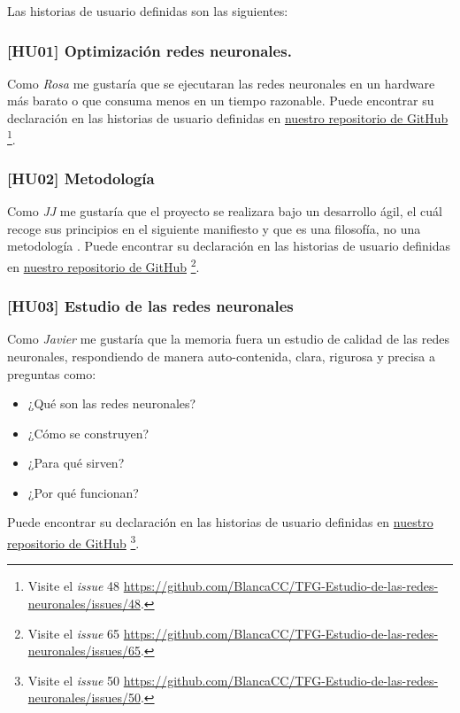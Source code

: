 Las historias de usuario definidas son las siguientes: 

\subsubsection*{[HU01] Optimización redes neuronales.}\label{HU01}
    Como \textit{Rosa} me gustaría que se ejecutaran las redes neuronales en un hardware
    más barato o que consuma menos en un tiempo razonable.
Puede encontrar su declaración en las historias de usuario definidas en \href{https://github.com/BlancaCC/TFG-Estudio-de-las-redes-neuronales}{nuestro repositorio 
de GitHub} \footnote{Visite el \textit{issue} 48 \url{https://github.com/BlancaCC/TFG-Estudio-de-las-redes-neuronales/issues/48}.}. 

\subsubsection*{ [HU02] Metodología} \label{HUO2}

Como \textit{JJ} me gustaría que el proyecto se realizara bajo un desarrollo ágil,  el cuál recoge sus principios en el siguiente manifiesto \cite{principios-manifiesto-agil} y que es una filosofía, no una metodología \cite{why-agile-is-not-a-methodology-1} \cite{why-agile-is-not-a-methodology-2}.
Puede encontrar su declaración en las historias de usuario definidas en \href{https://github.com/BlancaCC/TFG-Estudio-de-las-redes-neuronales}{nuestro repositorio 
de GitHub} \footnote{Visite el \textit{issue} 65 \url{https://github.com/BlancaCC/TFG-Estudio-de-las-redes-neuronales/issues/65}.}.
 

\subsubsection*{ [HU03] Estudio de las redes neuronales} \label{HUO3}
Como \textit{Javier} me gustaría que la memoria fuera un estudio de calidad de las redes neuronales, 
respondiendo de manera auto-contenida, clara, rigurosa y precisa a preguntas como:
\begin{itemize}
    \item ¿Qué son las redes neuronales?
    \item ¿Cómo se construyen?
    \item ¿Para qué sirven?
    \item ¿Por qué funcionan?
\end{itemize}
Puede encontrar su declaración en las historias de usuario definidas en \href{https://github.com/BlancaCC/TFG-Estudio-de-las-redes-neuronales}{nuestro repositorio 
de GitHub} \footnote{Visite el \textit{issue} 50 \url{https://github.com/BlancaCC/TFG-Estudio-de-las-redes-neuronales/issues/50}.}.

